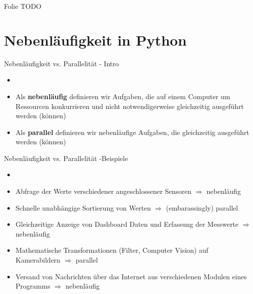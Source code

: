 \begin{frame}{Folie}
    TODO
\end{frame}

\section{Nebenläufigkeit in Python}

\begin{frame}{Nebenläufigkeit vs. Parallelität - Intro}
        \begin{itemize}
        \setlength{\itemindent}{2.0in}
        \item [\textbf{Definition: Nebenläufig vs. Parallel}]
    \end{itemize}

    \begin{itemize}
        \item Als \textbf{nebenläufig} definieren wir Aufgaben, die auf einem Computer um Ressourcen konkurrieren und nicht notwendigerweise gleichzeitig ausgeführt werden (können)
        \item Als \textbf{parallel} definieren wir nebenläufige Aufgaben, die gleichzeitig ausgeführt werden (können)
     \end{itemize}
\end{frame}

\begin{frame}{Nebenläufigkeit vs. Parallelität -Beispiele}
        \begin{itemize}
        \setlength{\itemindent}{2.0in}
        \item [\textbf{Beispiele: Nebenläufig oder Parallel ?}]
    \end{itemize}

    \begin{itemize}
        \item Abfrage der Werte verschiedener angeschlossener Sensoren $\Rightarrow$ nebenläufig
        \item Schnelle unabhängige Sortierung von Werten $\Rightarrow$ (embarassingly) parallel
        \item Gleichzeitige Anzeige von Dashboard Daten und Erfassung der Messwerte $\Rightarrow$ nebenläufig
        \item Mathematische Transformationen (Filter, Computer Vision) auf Kamerabildern  $\Rightarrow$ parallel %
        \item Versand von Nachrichten über das Internet aus verschiedenen Modulen eines Programms  $\Rightarrow$ nebenläufig
     \end{itemize}
\end{frame}

